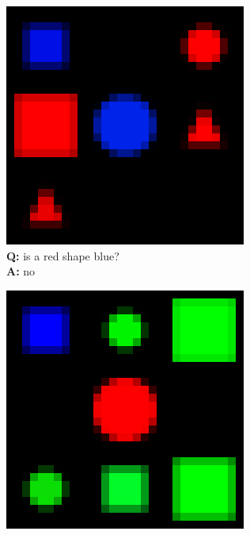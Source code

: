 \begin{figure}[ht]
  \centering
    \begin{subfigure}[b]{0.24\linewidth}
    \centering
    \includegraphics[width=\linewidth]{images/datasets/shapes0_big.png}
    \caption{\textbf{Q:} is a red shape blue? \\ \textbf{A:} no}
     \end{subfigure}
     \hfill
     \begin{subfigure}[b]{0.24\linewidth}
     \centering
    \includegraphics[width=\linewidth]{images/datasets/shapes1_big.png}

\end{subfigure}
\end{figure}
